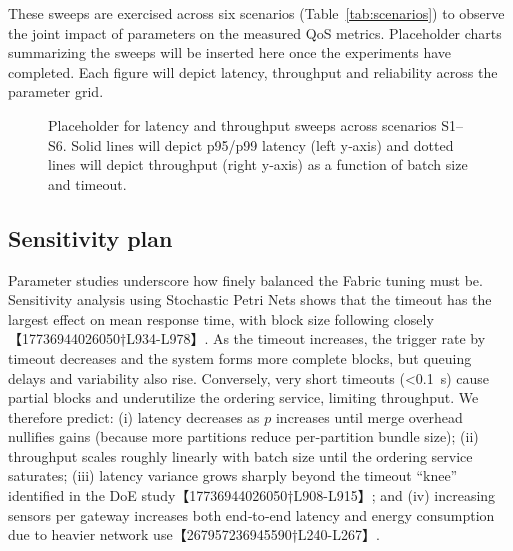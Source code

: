 These sweeps are exercised across six scenarios (Table~\ref{tab:scenarios}) to observe the joint impact of parameters on the measured QoS metrics.  Placeholder charts summarizing the sweeps will be inserted here once the experiments have completed.  Each figure will depict latency, throughput and reliability across the parameter grid.

\begin{figure}[!t]
  \centering
  \fbox{\rule{0pt}{1.75in}\rule{0.95\linewidth}{0pt}} %
  \caption{Placeholder for latency and throughput sweeps across scenarios S1–S6.  Solid lines will depict p95/p99 latency (left y‑axis) and dotted lines will depict throughput (right y‑axis) as a function of batch size and timeout.}
  \label{fig:sweep-results}
\end{figure}

\subsection{Sensitivity plan}
\label{sec:sensitivity}
Parameter studies underscore how finely balanced the Fabric tuning must be.  Sensitivity analysis using Stochastic Petri Nets shows that the timeout has the largest effect on mean response time, with block size following closely【17736944026050†L934-L978】.  As the timeout increases, the trigger rate by timeout decreases and the system forms more complete blocks, but queuing delays and variability also rise.  Conversely, very short timeouts (<0.1~s) cause partial blocks and underutilize the ordering service, limiting throughput.  We therefore predict: (i) latency decreases as $p$ increases until merge overhead nullifies gains (because more partitions reduce per‑partition bundle size); (ii) throughput scales roughly linearly with batch size until the ordering service saturates; (iii) latency variance grows sharply beyond the timeout “knee” identified in the DoE study【17736944026050†L908-L915】; and (iv) increasing sensors per gateway increases both end‑to‑end latency and energy consumption due to heavier network use【267957236945590†L240-L267】.

